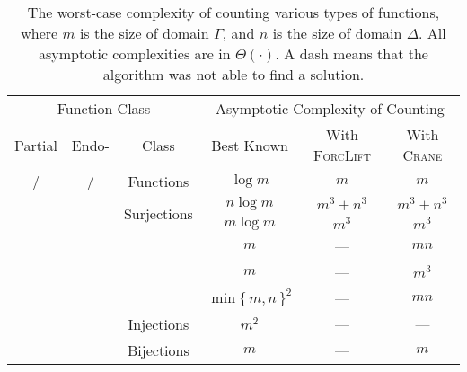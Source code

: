 \documentclass{article}
\theoremstyle{definition}
\theoremstyle{remark}
\newcommand{\cmark}{\ding{51}}%
\newcommand{\xmark}{\ding{55}}%
\begin{document}
\begin{table*}[t]
  \centering
  \begin{tabular}{cccccc}
    \toprule
    \multicolumn{3}{c}{Function Class} & \multicolumn{3}{c}{Asymptotic Complexity of Counting} \\
    Partial & Endo- & Class & Best Known & With \textsc{ForcLift} & With \textsc{Crane} \\
    \midrule
    \rowcolor{gray!25}\cmark/\xmark & \cmark/\xmark & Functions & $\log m$ & $m$ & $m$ \\
    \xmark & \xmark & \multirow{2}{*}{Surjections} & $n \log m$ & $m^{3}+n^{3}$ & $m^{3}+n^{3}$ \\
    \xmark & \cmark & & $m \log m$ & $m^{3}$ & $m^{3}$ \\
    \rowcolor{gray!25}\xmark & \xmark & & $m$ & --- & $mn$ \\
    \rowcolor{gray!25}\xmark & \cmark & & $m$ & --- & $m^3$ \\
    \rowcolor{gray!25}\cmark & \xmark & & ${\min\{\, m, n \,\}}^2$ & --- & $mn$ \\
    \rowcolor{gray!25}\cmark & \cmark & \multirow{-4}{*}{Injections} & $m^2$ & --- & --- \\
    \xmark & \xmark & Bijections & $m$ & --- & $m$ \\
    \bottomrule
  \end{tabular}
  \caption{The worst-case complexity of counting various types of functions,
    where $m$ is the size of domain $\Gamma$, and $n$ is the size of domain
    $\Delta$. All asymptotic complexities are in $\Theta(\cdot)$. A dash means
    that the algorithm was not able to find a solution.}\label{tbl:results}
\end{table*}



\end{document}
